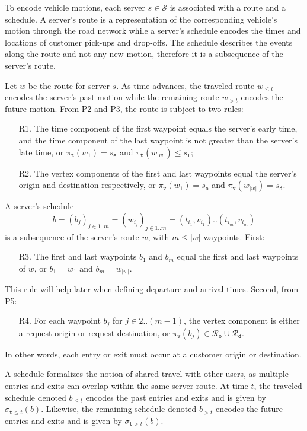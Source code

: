 To encode vehicle motions, each server $s\in\mathcal{S}$ is associated with a
route and a schedule.  A server's route is a representation of the corresponding
vehicle's motion through the road network while a server's schedule
encodes the times and locations of customer pick-ups and drop-offs.
The schedule describes the events along the route and not any new motion,
therefore it is a subsequence of the server's route.

Let $w$ be the route for server $s$. As time
advances, the traveled route $w_{\leq t}$ encodes the server's past
motion while the remaining route $w_{>t}$ encodes the future motion.
From P2 and P3, the route is subject to two rules:
\begin{enumerate}
\item[R1.] The time component of the first waypoint equals the server's early time,
  and the time component of the last waypoint is not greater than the server's late time,
  or $\pi_\texttt{t}(w_1)=s_\texttt{e}$ and $\pi_\texttt{t}(w_{|w|})\leq s_\texttt{l}$;
\item[R2.] The vertex components of the first and last waypoints equal the
  server's origin and destination respectively, or
  $\pi_\texttt{v}(w_1)=s_\texttt{o}$ and $\pi_\texttt{v}(w_{|w|})=s_\texttt{d}$.
\end{enumerate}

A server's schedule
$$b=(b_j)_{j\in 1..m}=(w_{i_j})_{j\in 1..m}=(t_{i_1},v_{i_1})..(t_{i_m},v_{i_m})$$
is a subsequence of the server's route $w$, with $m\leq |w|$ waypoints.
First:
\begin{enumerate}
\item[R3.] The first and last waypoints $b_1$ and $b_m$ equal the first and last
waypoints of $w$, or ${b_1=w_1}$ and ${b_m=w_{|w|}}$.
\end{enumerate}
This rule will help later when defining departure and arrival times.
Second, from P5:
\begin{enumerate}
\item[R4.] For each waypoint $b_j$ for $j\in 2..(m-1)$, the vertex component is either a
request origin or request destination, or $\pi_\texttt{v}(b_j)\in
\mathcal{R}_\texttt{o}\cup\mathcal{R}_\texttt{d}$.
\end{enumerate}
In other words, each entry or exit must occur at a customer origin or destination.

A schedule formalizes the notion of shared travel with other users, as
multiple entries and exits can overlap within the same server route.
At time $t$, the traveled schedule denoted $b_{\leq t}$ encodes the past entries and exits and is given by
$\sigma_{\texttt{t}\leq t}(b)$. Likewise, the remaining schedule denoted
$b_{>t}$ encodes the future entries and exits and is given by $\sigma_{\texttt{t}>t}(b)$.

